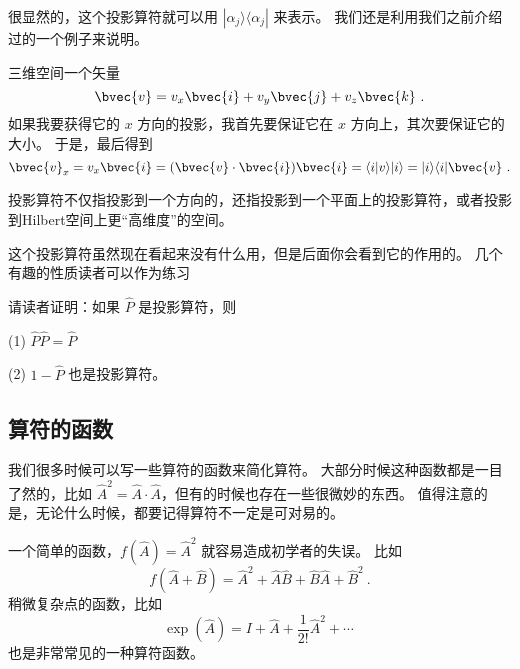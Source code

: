 很显然的，这个投影算符就可以用 $|\alpha_j\rangle\langle\alpha_j|$ 来表示。 我们还是利用我们之前介绍过的一个例子来说明。

\begin{example}{}
三维空间一个矢量
\begin{equation}
\bvec{v} = v_x\bvec{i} + v_y\bvec{j} + v_z \bvec{k}~.
\end{equation}
如果我要获得它的 $x$ 方向的投影，我首先要保证它在 $x$ 方向上，其次要保证它的大小。 于是，最后得到
\begin{equation}
\bvec{v}_x = v_x\bvec{i} = (\bvec{v}\cdot\bvec{i})\bvec{i} = \langle i|v\rangle |i\rangle = |i\rangle\langle i| \bvec{v}~.
\end{equation}
\end{example}

投影算符不仅指投影到一个方向的，还指投影到一个平面上的投影算符，或者投影到Hilbert空间上更“高维度”的空间。

这个投影算符虽然现在看起来没有什么用，但是后面你会看到它的作用的。 几个有趣的性质读者可以作为练习

\begin{exercise}{}
请读者证明：如果 $\hat{P}$ 是投影算符，则

(1) $\hat{P}\hat{P} = \hat{P}$

(2) $1-\hat{P}$ 也是投影算符。
\end{exercise}

\subsection{算符的函数}

我们很多时候可以写一些算符的函数来简化算符。 大部分时候这种函数都是一目了然的，比如 $\hat{A}^2 = \hat{A}\cdot\hat{A}$，但有的时候也存在一些很微妙的东西。 值得注意的是，无论什么时候，都要记得算符不一定是可对易的。

一个简单的函数，$f(\hat{A}) = \hat{A}^2$ 就容易造成初学者的失误。 比如
\begin{equation}
f(\hat{A}+\hat{B}) = \hat{A}^2 + \hat{A}\hat{B} + \hat{B}\hat{A} + \hat{B}^2~.
\end{equation}
稍微复杂点的函数，比如
\begin{equation}
\exp(\hat{A}) = I + \hat{A} + \frac{1}{2!}\hat{A}^2 + \cdots~
\end{equation}
也是非常常见的一种算符函数。

